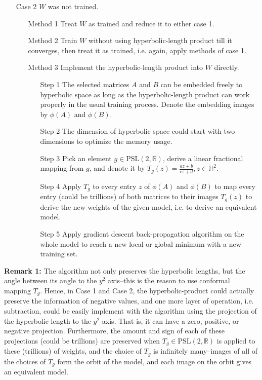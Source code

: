 \documentclass{article}
\theoremstyle{plain}
\theoremstyle{plain} %
\theoremstyle{definition}  %
\theoremstyle{remark}  %
\theoremstyle{plain}
\begin{document}
\begin{itemize}
\item[Case 2] $W$ was not trained.
\begin{itemize}
\item[Method 1] Treat $W$ as trained and reduce it to either case 1.
\item[Method 2] Train $W$ without using hyperbolic-length product till it converges, then treat it as trained, i.e. again, apply methods of case 1.
\item[Method 3] Implement the hyperbolic-length product into $W$ directly.
\begin{itemize}
\item[Step 1] The selected matrices $A$ and $B$ can be embedded freely to hyperbolic space as long as the hyperbolic-length product can work properly in the usual training process. Denote the embedding images by $\phi(A)$ and $\phi(B)$.
\item[Step 2] The dimension of hyperbolic space could start with two dimensions to optimize the memory usage.
\item[Step 3] Pick an element $g\in\text{PSL}(2,\mathbb{R})$, derive a linear fractional mapping from $g$, and denote it by $T_g(z)=\frac{az+b}{cz+d}, z\in\mathbb{H}^2$.
\item[Step 4] Apply $T_g$ to every entry $z$ of $\phi(A)$ and $\phi(B)$ to map every entry (could be trillions) of both matrices to their images $T_g(z)$ to derive the new weights of the given model, i.e. to derive an equivalent model.

\item[Step 5] Apply gradient descent back-propagation algorithm on the whole model to reach a new local or global minimum with a new training set.
\end{itemize}
\end{itemize}
\end{itemize}
\textbf{Remark 1:} The algorithm not only preserves the hyperbolic lengths, but the angle between its angle to the $y^2$ axis--this is the reason to use conformal mapping $T_g$. Hence, in Case 1 and Case 2, the hyperbolic-product could actually preserve the information of negative values, and one more layer of operation, i.e. subtraction, could be easily implement with the algorithm using the projection of the hyperbolic length to the $y^2$-axis. That is, it can have a zero, positive, or negative projection. Furthermore, the amount and sign of each of these projections (could be trillions) are preserved when $T_g\in\text{PSL}(2,\mathbb{R})$ is applied to these (trillions) of weights, and the choice of $T_g$ is infinitely many--images of all of the choices of $T_g$ form the orbit of the model, and each image on the orbit gives an equivalent model.
\end{document}
